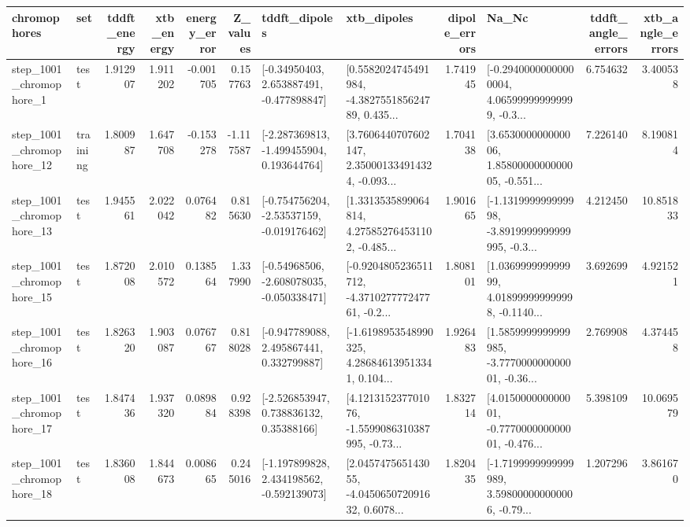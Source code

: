 \begin{tabular}{llrrrrllrlrr}
\toprule
             chromophores &       set &  tddft\_energy &  xtb\_energy &  energy\_error &  Z\_values &                               tddft\_dipoles &                                        xtb\_dipoles &  dipole\_errors &                                              Na\_Nc &  tddft\_angle\_errors &  xtb\_angle\_errors \\
\midrule
  step\_1001\_chromophore\_1 &      test &      1.912907 &    1.911202 &     -0.001705 &  0.157763 &    [-0.34950403, 2.653887491, -0.477898847] &  [0.5582024745491984, -4.382755185624789, 0.435... &       1.741945 &  [-0.29400000000000004, 4.065999999999999, -0.3... &            6.754632 &          3.400538 \\
 step\_1001\_chromophore\_12 &  training &      1.800987 &    1.647708 &     -0.153278 & -1.117587 &   [-2.287369813, -1.499455904, 0.193644764] &  [3.7606440707602147, 2.350001334914324, -0.093... &       1.704138 &  [3.653000000000006, 1.8580000000000005, -0.551... &            7.226140 &          8.190814 \\
 step\_1001\_chromophore\_13 &      test &      1.945561 &    2.022042 &      0.076482 &  0.815630 &   [-0.754756204, -2.53537159, -0.019176462] &  [1.3313535899064814, 4.275852764531102, -0.485... &       1.901665 &  [-1.131999999999998, -3.8919999999999995, -0.3... &            4.212450 &         10.851833 \\
 step\_1001\_chromophore\_15 &      test &      1.872008 &    2.010572 &      0.138564 &  1.337990 &   [-0.54968506, -2.608078035, -0.050338471] &  [-0.9204805236511712, -4.371027777247761, -0.2... &       1.808101 &  [1.036999999999999, 4.018999999999998, -0.1140... &            3.692699 &          4.921521 \\
 step\_1001\_chromophore\_16 &      test &      1.826320 &    1.903087 &      0.076767 &  0.818028 &    [-0.947789088, 2.495867441, 0.332799887] &  [-1.6198953548990325, 4.286846139513341, 0.104... &       1.926483 &  [1.5859999999999985, -3.777000000000001, -0.36... &            2.769908 &          4.374458 \\
 step\_1001\_chromophore\_17 &      test &      1.847436 &    1.937320 &      0.089884 &  0.928398 &     [-2.526853947, 0.738836132, 0.35388166] &  [4.121315237701076, -1.5599086310387995, -0.73... &       1.832714 &  [4.015000000000001, -0.777000000000001, -0.476... &            5.398109 &         10.069579 \\
 step\_1001\_chromophore\_18 &      test &      1.836008 &    1.844673 &      0.008665 &  0.245016 &   [-1.197899828, 2.434198562, -0.592139073] &  [2.045747565143055, -4.045065072091632, 0.6078... &       1.820435 &  [-1.7199999999999989, 3.598000000000006, -0.79... &            1.207296 &          3.861670 \\

\end{tabular}
